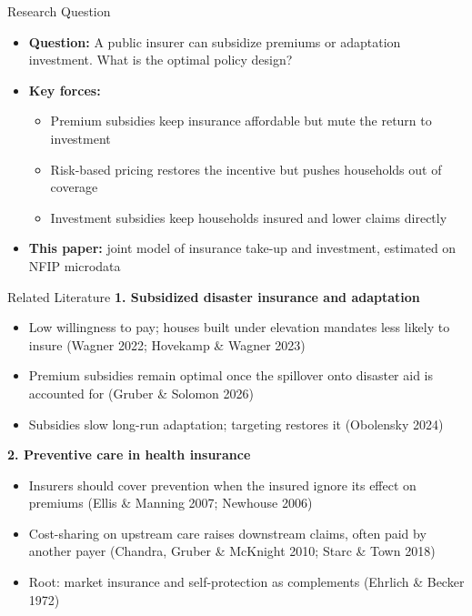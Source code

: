 \documentclass[serif, aspectratio=169, 10pt]{beamer}
\begin{document}
\begin{frame}{Research Question}
\begin{itemize}
    \item \textbf{Question:} A public insurer can subsidize premiums or adaptation investment. What is the optimal policy design?
    \item \textbf{Key forces:}
    \begin{itemize}
        \item Premium subsidies keep insurance affordable but mute the return to investment
        \item Risk-based pricing restores the incentive but pushes households out of coverage
        \item Investment subsidies keep households insured and lower claims directly
    \end{itemize}
    \item \textbf{This paper:} joint model of insurance take-up and investment, estimated on NFIP microdata
\end{itemize}
\end{frame}

\begin{frame}{Related Literature}
\textbf{1. Subsidized disaster insurance and adaptation}
\begin{itemize}
    \item Low willingness to pay; houses built under elevation mandates less likely to insure (Wagner 2022; Hovekamp \& Wagner 2023)
    \item Premium subsidies remain optimal once the spillover onto disaster aid is accounted for (Gruber \& Solomon 2026)
    \item Subsidies slow long-run adaptation; targeting restores it (Obolensky 2024)
\end{itemize}
\textbf{2. Preventive care in health insurance}
\begin{itemize}
    \item Insurers should cover prevention when the insured ignore its effect on premiums (Ellis \& Manning 2007; Newhouse 2006)
    \item Cost-sharing on upstream care raises downstream claims, often paid by another payer (Chandra, Gruber \& McKnight 2010; Starc \& Town 2018)
    \item Root: market insurance and self-protection as complements (Ehrlich \& Becker 1972)
\end{itemize}
\end{frame}
\end{document}

